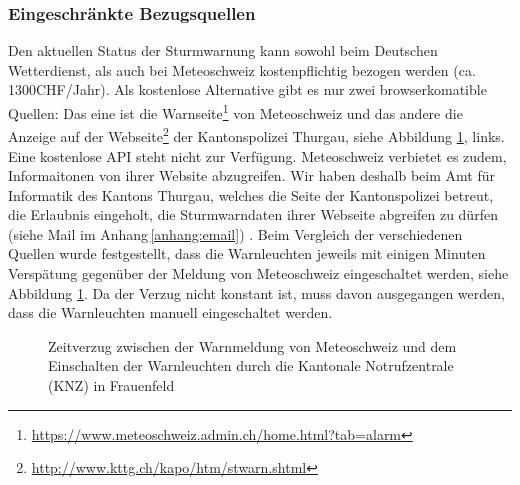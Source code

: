 \subsubsection{Eingeschränkte Bezugsquellen}
Den aktuellen Status der Sturmwarnung kann sowohl beim Deutschen Wetterdienst, als auch bei Meteoschweiz kostenpflichtig bezogen werden (ca. 1300CHF/Jahr). Als kostenlose Alternative gibt es nur zwei browserkomatible Quellen: Das eine ist die Warnseite\footnote{ \url{https://www.meteoschweiz.admin.ch/home.html?tab=alarm}}  von Meteoschweiz und das andere die Anzeige auf der Webseite\footnote{ \url{http://www.kttg.ch/kapo/htm/stwarn.shtml}} der Kantonspolizei Thurgau, siehe Abbildung \ref{img:sturmZeit}, links. Eine kostenlose API steht nicht zur Verfügung. Meteoschweiz verbietet es zudem, Informaitonen von ihrer Website abzugreifen. Wir haben deshalb beim Amt für Informatik des Kantons Thurgau, welches die Seite der Kantonspolizei betreut, die Erlaubnis eingeholt, die Sturmwarndaten ihrer Webseite abgreifen zu dürfen (siehe Mail im Anhang\,\ref{anhang:email}) . Beim Vergleich der verschiedenen Quellen wurde festgestellt, dass die Warnleuchten jeweils mit einigen Minuten Verspätung gegenüber der Meldung von Meteoschweiz eingeschaltet werden, siehe Abbildung \ref{img:sturmZeit}. Da der Verzug nicht konstant ist, muss davon ausgegangen werden, dass die Warnleuchten manuell eingeschaltet werden.\\

\begin{figure}[h!]
	\centering
	\caption[Zeitverzug zwischen Sturmwarnmeldung und Anzeige]{Zeitverzug zwischen der Warnmeldung von Meteoschweiz und dem Einschalten der Warnleuchten durch die Kantonale Notrufzentrale (KNZ) in Frauenfeld}
	\label{img:sturmZeit}
\end{figure}


